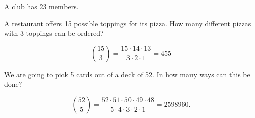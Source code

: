 \documentclass[answers,11pt]{exam}
\begin{document}
\begin{questions}




\question A club has 23 members.  




\question A restaurant offers 15 possible toppings for its pizza.  How many
different pizzas with 3 toppings can be ordered?

\begin{solution}
\[
  \binom{15}{3} = \frac{15 \cdot 14 \cdot 13}{3 \cdot 2 \cdot 1} = 455
\]
\end{solution}



\question We are going to pick 5 cards out of a deck of 52.  In how many ways
can this be done?

\begin{solution}
\[
  \binom{52}{5}
  = \frac{52 \cdot 51 \cdot 50 \cdot 49 \cdot 48}{5 \cdot 4 \cdot 3 \cdot 2 \cdot 1}
  = 2598960.
\]
\end{solution}



\end{questions}
\end{document}
